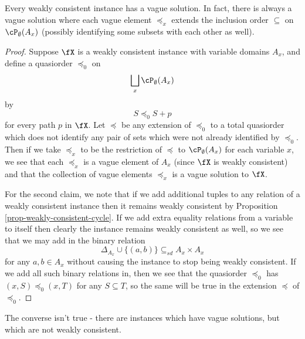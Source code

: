 \begin{prop} Every weakly consistent instance has a vague solution. In fact, there is always a vague solution where each vague element $\preceq_x$ extends the inclusion order $\subseteq$ on $\cP_\emptyset(A_x)$ (possibly identifying some subsets with each other as well).
\end{prop}
\begin{proof} Suppose $\fX$ is a weakly consistent instance with variable domains $A_x$, and define a quasiorder $\preceq_0$ on
\[
\bigsqcup_x \cP_\emptyset(A_x)
\]
by
\[
S \preceq_0 S+p
\]
for every path $p$ in $\fX$. Let $\preceq$ be any extension of $\preceq_0$ to a total quasiorder which does not identify any pair of sets which were not already identified by $\preceq_0$. Then if we take $\preceq_x$ to be the restriction of $\preceq$ to $\cP_\emptyset(A_x)$ for each variable $x$, we see that each $\preceq_x$ is a vague element of $A_x$ (since $\fX$ is weakly consistent) and that the collection of vague elements $\preceq_x$ is a vague solution to $\fX$.

For the second claim, we note that if we add additional tuples to any relation of a weakly consistent instance then it remains weakly consistent by Proposition \ref{prop-weakly-consistent-cycle}. If we add extra equality relations from a variable to itself then clearly the instance remains weakly consistent as well, so we see that we may add in the binary relation
\[
\Delta_{A_x} \cup \{(a,b)\} \subseteq_{sd} A_x \times A_x
\]
for any $a,b \in A_x$ without causing the instance to stop being weakly consistent. If we add all such binary relations in, then we see that the quasiorder $\preceq_0$ has $(x,S) \preceq_0 (x,T)$ for any $S \subseteq T$, so the same will be true in the extension $\preceq$ of $\preceq_0$.
\end{proof}

The converse isn't true - there are instances which have vague solutions, but which are not weakly consistent.

